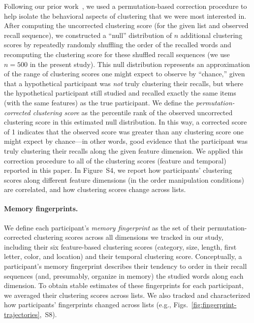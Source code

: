 \documentclass[11pt]{article}
\newcommand{\clusterCorrs}{S4}
\newcommand{\fingerprintTrajectoryRandom}{S8}
\begin{document}
Following our prior work~\citep{HeusEtal17}, we used a permutation-based
correction procedure to help isolate the behavioral aspects of clustering that
we were most interested in. After computing the uncorrected clustering score
(for the given list and observed recall sequence), we constructed a ``null''
distribution of $n$ additional clustering scores by repeatedly randomly
shuffling the order of the recalled words and recomputing the clustering score
for these shuffled recall sequences (we use $n = 500$ in the present study).
This null distribution represents an approximation of the range of clustering
scores one might expect to observe by ``chance,'' given that a hypothetical
participant was \textit{not} truly clustering their recalls, but where the
hypothetical participant still studied and recalled exactly the same items
(with the same features) as the true participant. We define the
\textit{permutation-corrected clustering score} as the percentile rank of the
observed uncorrected clustering score in this estimated null distribution. In
this way, a corrected score of 1 indicates that the observed score was greater
than any clustering score one might expect by chance---in other words, good
evidence that the participant was truly clustering their recalls along the
given feature dimension. We applied this correction procedure to all of the
clustering scores (feature and temporal) reported in this paper. In
Figure~\clusterCorrs, we report how participants' clustering scores along
different feature dimensions (in the order manipulation conditions) are
correlated, and how clustering scores change across lists.

\paragraph*{Memory fingerprints.}

We define each participant's \textit{memory fingerprint} as the set of their
permutation-corrected clustering scores across all dimensions we tracked in our
study, including their six feature-based clustering scores (category, size,
length, first letter, color, and location) and their temporal clustering score.
Conceptually, a participant's memory fingerprint describes their tendency to
order in their recall sequences (and, presumably, organize in memory) the
studied words along each dimension. To obtain stable estimates of these
fingerprints for each participant, we averaged their clustering scores across
lists. We also tracked and characterized how participants' fingerprints changed
across lists (e.g.,
Figs.~\ref{fig:fingerprint-trajectories},~\fingerprintTrajectoryRandom).
\end{document}
